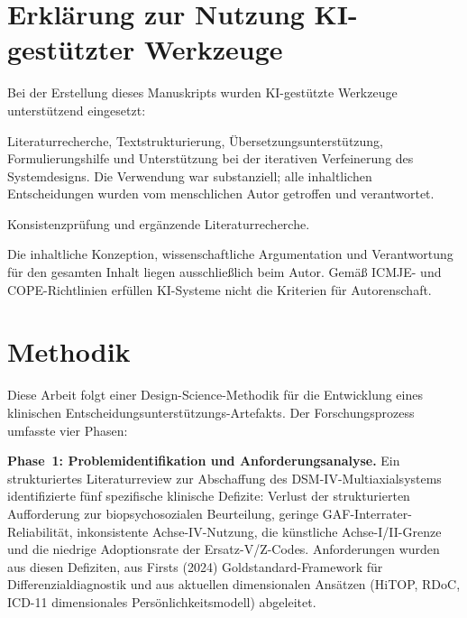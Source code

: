 \documentclass[11pt,a4paper]{article}
\begin{document}
\newpage
\tableofcontents
\newpage

\section*{Erkl\"arung zur Nutzung KI-gest\"utzter Werkzeuge}

Bei der Erstellung dieses Manuskripts wurden KI-gest\"utzte Werkzeuge unterst\"utzend eingesetzt:

\begin{description}[style=nextline, leftmargin=2cm]
\item[\textbf{Claude Opus 4.6} (Anthropic)] Literaturrecherche, Textstrukturierung, \"Ubersetzungsunterst\"utzung, Formulierungshilfe und Unterst\"utzung bei der iterativen Verfeinerung des Systemdesigns. Die Verwendung war substanziell; alle inhaltlichen Entscheidungen wurden vom menschlichen Autor getroffen und verantwortet.
\item[\textbf{Gemini} (Google DeepMind) \& \textbf{Copilot} (Microsoft)] Konsistenzpr\"ufung und erg\"anzende Literaturrecherche.
\end{description}

\noindent Die inhaltliche Konzeption, wissenschaftliche Argumentation und Verantwortung f\"ur den gesamten Inhalt liegen ausschlie\ss{}lich beim Autor. Gem\"a\ss{} ICMJE- und COPE-Richtlinien erf\"ullen KI-Systeme nicht die Kriterien f\"ur Autorenschaft.

\newpage

\section{Methodik}

Diese Arbeit folgt einer Design-Science-Methodik f\"ur die Entwicklung eines klinischen Entscheidungsunterst\"utzungs-Artefakts. Der Forschungsprozess umfasste vier Phasen:

\textbf{Phase~1: Problemidentifikation und Anforderungsanalyse.} Ein strukturiertes Literaturreview zur Abschaffung des DSM-IV-Multiaxialsystems identifizierte f\"unf spezifische klinische Defizite: Verlust der strukturierten Aufforderung zur biopsychosozialen Beurteilung, geringe GAF-Interrater-Reliabilit\"at, inkonsistente Achse-IV-Nutzung, die k\"unstliche Achse-I/II-Grenze und die niedrige Adoptionsrate der Ersatz-V/Z-Codes. Anforderungen wurden aus diesen Defiziten, aus Firsts (2024) Goldstandard-Framework f\"ur Differenzialdiagnostik und aus aktuellen dimensionalen Ans\"atzen (HiTOP, RDoC, ICD-11 dimensionales Pers\"onlichkeitsmodell) abgeleitet.
\end{document}
